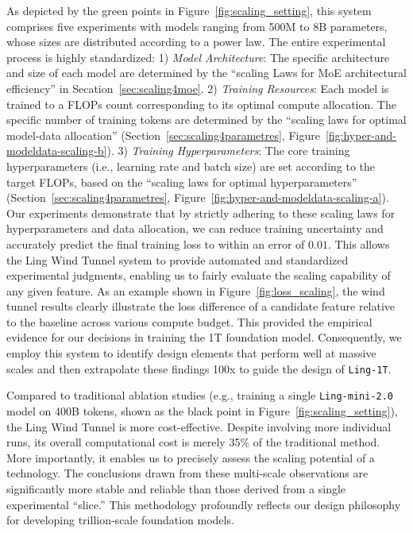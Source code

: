 As depicted by the green points in Figure~\ref{fig:scaling_setting}, this system comprises five experiments with models ranging from 500M to 8B parameters, whose sizes are distributed according to a power law. The entire experimental process is highly standardized:
1) \textit{Model Architecture}: The specific architecture and size of each model are determined by the ``scaling Laws for MoE architectural efficiency'' in Secation~\ref{sec:scaling4moe}. 
2) \textit{Training Resources}: Each model is trained to a FLOPs count corresponding to its optimal compute allocation. The specific number of training tokens are determined by the ``scaling laws for optimal model-data allocation'' (Section~\ref{sec:scaling4parametres}, Figure~\ref{fig:hyper-and-modeldata-scaling-b}).
3) \textit{Training Hyperparameters}: The core training hyperparameters (i.e., learning rate and batch size) are set according to the target FLOPs, based on the ``scaling laws for optimal hyperparameters'' (Section~\ref{sec:scaling4parametres}, Figure~\ref{fig:hyper-and-modeldata-scaling-a}). 
Our experiments demonstrate that by strictly adhering to these scaling laws for hyperparameters and data allocation, we can reduce training uncertainty and accurately predict the final training loss to within an error of $0.01$. This allows the Ling Wind Tunnel system to provide automated and standardized experimental judgments, enabling us to fairly evaluate the scaling capability of any given feature. As an example shown in Figure~\ref{fig:loss_scaling}, the wind tunnel results clearly illustrate the loss difference of a candidate feature relative to the baseline across various compute budget. This provided the empirical evidence for our decisions in training the 1T foundation model. Consequently, we employ this system to identify design elements that perform well at massive scales and then extrapolate these findings 100x to guide the design of \texttt{Ling-1T}.

Compared to traditional ablation studies (e.g., training a single \texttt{\texttt{Ling-mini-2.0}} model on 400B tokens, shown as the black point in Figure~\ref{fig:scaling_setting}), the Ling Wind Tunnel is more cost-effective. Despite involving more individual runs, its overall computational cost is merely 35\% of the traditional method. More importantly, it enables us to precisely assess the scaling potential of a technology. The conclusions drawn from these multi-scale observations are significantly more stable and reliable than those derived from a single experimental ``slice.'' This methodology profoundly reflects our design philosophy for developing trillion-scale foundation models.





